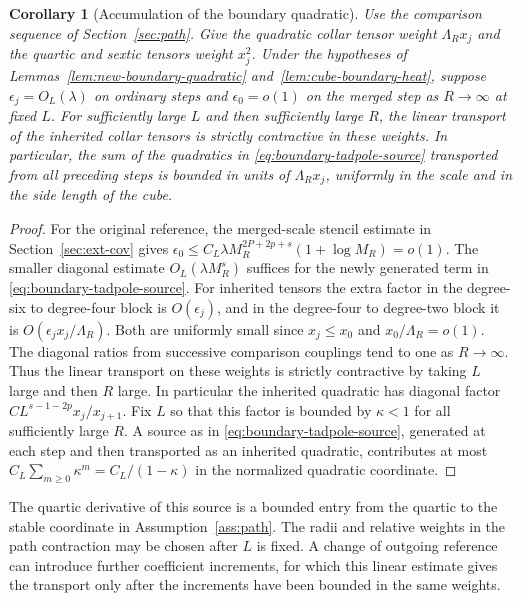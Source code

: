 \documentclass[11pt]{article}
\newtheorem{corollary}[theorem]{Corollary}
\theoremstyle{definition}
\begin{document}
\begin{corollary}[Accumulation of the boundary quadratic]
\label{cor:accumulated-boundary-source}
Use the comparison sequence of Section~\ref{sec:path}. Give the
quadratic collar tensor weight \(\Lambda_R x_j\) and the quartic
and sextic tensors weight \(x_j^2\). Under the hypotheses of
Lemmas~\ref{lem:new-boundary-quadratic} and~\ref{lem:cube-boundary-heat},
suppose \(\epsilon_j=O_L(\lambda)\) on ordinary steps and
\(\epsilon_0=o(1)\) on the merged step as \(R\to\infty\) at fixed \(L\).
For sufficiently large \(L\) and then sufficiently large \(R\),
the linear transport of the inherited collar tensors is strictly
contractive in these weights. In particular, the sum of the
quadratics in \eqref{eq:boundary-tadpole-source} transported from
all preceding steps is bounded in units of \(\Lambda_R x_j\),
uniformly in the scale and in the side length of the cube.
\end{corollary}

\begin{proof}
For the original reference, the merged-scale stencil estimate in
Section~\ref{sec:ext-cov} gives
\(\epsilon_0\le C_L\lambda M_R^{2P+2p+s}(1+\log M_R)=o(1)\).
The smaller diagonal estimate \(O_L(\lambda M_R^s)\) suffices for
the newly generated term in \eqref{eq:boundary-tadpole-source}.
For inherited tensors the extra factor in the degree-six to degree-four block is
\(O(\epsilon_j)\), and in the degree-four to degree-two block
it is \(O(\epsilon_j x_j/\Lambda_R)\). Both are uniformly
small since \(x_j\le x_0\) and \(x_0/\Lambda_R=o(1)\). The diagonal ratios from successive comparison
couplings tend to one as \(R\to\infty\). Thus the linear transport
on these weights is strictly contractive by taking \(L\) large
and then \(R\) large. In particular the inherited quadratic has
diagonal factor \(C L^{s-1-2p}x_j/x_{j+1}\). Fix \(L\) so that
this factor is bounded by \(\kappa<1\) for all sufficiently large
\(R\). A source as in \eqref{eq:boundary-tadpole-source}, generated
at each step and then transported as an inherited quadratic, contributes
at most \(C_L\sum_{m\ge0}\kappa^m=C_L/(1-\kappa)\) in the normalized
quadratic coordinate.
\end{proof}

The quartic derivative of this source is a bounded entry from
the quartic to the stable coordinate in Assumption~\ref{ass:path}.
The radii and relative weights in the path contraction may be chosen
after \(L\) is fixed. A change of outgoing reference can introduce further coefficient
increments, for which this linear estimate gives the transport
only after the increments have been bounded in the same weights.
\end{document}
